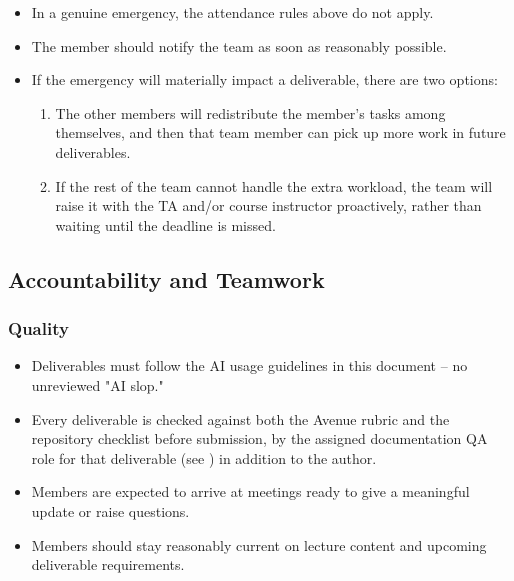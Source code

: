 \documentclass{article}
\begin{document}

\begin{itemize}
    \item In a genuine emergency, the attendance rules above do not apply.
    \item The member should notify the team as soon as reasonably possible.
    \item If the emergency will materially impact a deliverable, there are two
          options:
          \begin{enumerate}
              \item The other members will redistribute the member's tasks
                    among themselves, and then that team member can pick up
                    more work in future deliverables.
              \item If the rest of the team cannot handle the extra workload,
                    the team will raise it with the TA and/or course instructor
                    proactively, rather than waiting until the deadline is
                    missed.
          \end{enumerate}
\end{itemize}

\subsection*{Accountability and Teamwork}

\subsubsection*{Quality}


\begin{itemize}
    \item Deliverables must follow the AI usage guidelines in this document --
          no unreviewed "AI slop."
    \item Every deliverable is checked against both the Avenue rubric and the
          repository checklist before submission, by the assigned documentation
          QA role for that deliverable (see ) in addition to
          the author.
    \item Members are expected to arrive at meetings ready to give a meaningful
          update or raise questions.
    \item Members should stay reasonably current on lecture content and
          upcoming deliverable requirements.
\end{itemize}
\end{document}
